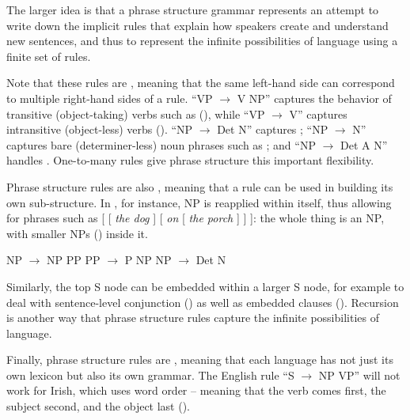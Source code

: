 
The larger idea is that a phrase structure grammar represents an attempt to write down the implicit rules that explain how speakers create and understand new sentences, and thus to represent the infinite possibilities of language using a finite set of rules.

Note that these rules are , meaning that the same left-hand side can correspond to multiple right-hand sides of a rule.   ``VP $\to$ V NP'' captures the behavior of transitive (object-taking) verbs such as  (), while ``VP $\to$ V'' captures intransitive (object-less) verbs ().   ``NP $\to$ Det N'' captures ; ``NP $\to$ N'' captures bare (determiner-less) noun phrases such as ; and ``NP $\to$ Det A N'' handles .  One-to-many rules give phrase structure this important flexibility.

Phrase structure rules are also , meaning that a rule can be used in building its own sub-structure. In , for instance, NP is
reapplied within itself, thus allowing for phrases such as 
 [ [ \textit{the dog} ] [ \textit{on} [ \textit{the porch} ] ] ]: the whole thing is an NP, with smaller NPs () inside it.

\ea \label{ex:recursion} 
	\ea NP $\to$ NP PP
	\ex PP $\to$ P NP
	\ex NP $\to$ Det N
 \z 
 \z


Similarly, the top S node can be embedded within a larger S node, for example to deal with sentence-level conjunction () as well as embedded clauses ().  Recursion is another way that phrase structure rules capture the infinite possibilities of language.

Finally, phrase structure rules are , meaning that each language has not just its own lexicon but also its own grammar.  The English rule ``S $\to$ NP VP'' will not work for Irish, which uses  word order -- meaning that the verb comes first, the subject second, and the object last ().

